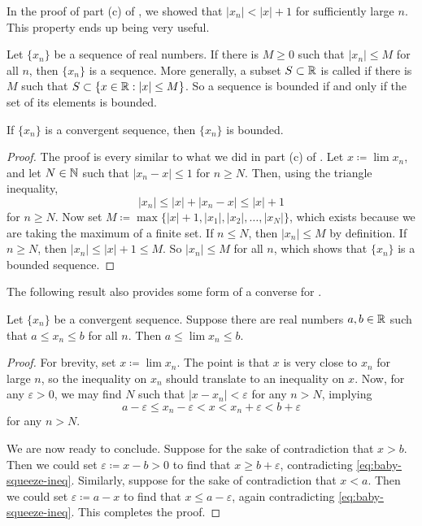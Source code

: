 \documentclass[../notes.tex]{subfiles}
\begin{document}
In the proof of part (c) of , we showed that $|x_n| < |x|+1$ for sufficiently large $n$. This property ends up being very useful.

\begin{definition}
    Let $\{x_n\}$ be a sequence of real numbers. If there is $M\geq 0$ such that $|x_n|\leq M$ for all $n$, then $\{x_n\}$ is a  sequence. More generally, a subset $S\subset \mathbb R$ is called  if there is $M$ such that $S\subset \{x\in \mathbb R : |x|\leq M\}$. So a sequence is bounded if and only if the set of its elements is bounded. 
\end{definition}

\begin{proposition} \label{prop:conv-impy-bded}
    If $\{x_n\}$ is a convergent sequence, then $\{x_n\}$ is bounded.
\end{proposition}
\begin{proof}
    The proof is every similar to what we did in part (c) of . Let $x\coloneqq\lim x_n$, and let $N\in \mathbb N$ such that $|x_n-x|\leq 1$ for $n\geq N$. Then, using the triangle inequality,
    \[|x_n| \leq |x| + |x_n-x| \leq |x|+1\]
    for $n\geq N$. Now set $M\coloneqq\max\{|x|+1, |x_1|, |x_2|, \dots, |x_N|\}$, which exists because we are taking the maximum of a finite set. If $n\leq N$, then $|x_n|\leq M$ by definition. If $n\geq N$, then $|x_n|\leq |x|+1 \leq M$. So $|x_n|\leq M$ for all $n$, which shows that $\{x_n\}$ is a bounded sequence.  
\end{proof}
The following result also provides some form of a converse for .
\begin{proposition} \label{prop:bound-seq-is-bound-limit}
    Let $\{x_n\}$ be a convergent sequence. Suppose there are real numbers $a,b\in\mathbb R$ such that $a\le x_n\le b$ for all $n$. Then $a\le\lim x_n\le b$.
\end{proposition}
\begin{proof}
    For brevity, set $x\coloneqq\lim x_n$. The point is that $x$ is very close to $x_n$ for large $n$, so the inequality on $x_n$ should translate to an inequality on $x$. Now, for any $\varepsilon>0$, we may find $N$ such that $\left|x-x_n\right|<\varepsilon$ for any $n>N$, implying
    \begin{equation}
        a-\varepsilon\le x_n-\varepsilon<x<x_n+\varepsilon<b+\varepsilon \label{eq:baby-squeeze-ineq}
    \end{equation}
    for any $n>N$.

    We are now ready to conclude. Suppose for the sake of contradiction that $x>b$. Then we could set $\varepsilon\coloneqq x-b>0$ to find that $x\ge b+\varepsilon$, contradicting \eqref{eq:baby-squeeze-ineq}. Similarly, suppose for the sake of contradiction that $x<a$. Then we could set $\varepsilon\coloneqq a-x$ to find that $x\le a-\varepsilon$, again contradicting \eqref{eq:baby-squeeze-ineq}. This completes the proof.
\end{proof}
\end{document}
